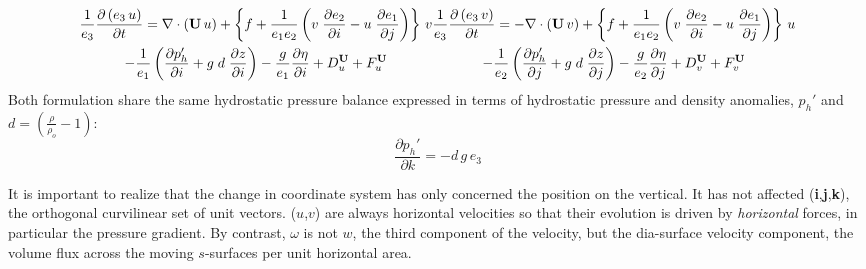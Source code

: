 \documentclass[../main/NEMO_manual]{subfiles}
\begin{document}
\begin{subequations}
  \label{apdx:A_dyn_flux}
  \begin{multline}
    \label{apdx:A_PE_dyn_flux_u}
    \frac{1}{e_3} \frac{\partial \left(  e_3\,u  \right) }{\partial t} =
    \nabla \cdot \left(   {{\rm {\bf U}}\,u}   \right)
    +   \left\{ {f + \frac{1}{e_1 e_2 }\left(    v  \;\frac{\partial e_2 }{\partial i}
          -u  \;\frac{\partial e_1 }{\partial j}            \right)} \right\} \,v     \\
    -   \frac{1}{e_1 } \left(    \frac{\partial p_h'}{\partial i} + g\; d  \; \frac{\partial z}{\partial i}    \right)
    -   \frac{g}{e_1 } \frac{\partial \eta}{\partial i}
    +   D_u^{\vect{U}}  +   F_u^{\vect{U}}
  \end{multline}
  \begin{multline}
    \label{apdx:A_dyn_flux_v}
    \frac{1}{e_3}\frac{\partial \left(  e_3\,v  \right) }{\partial t}=
    -  \nabla \cdot \left(   {{\rm {\bf U}}\,v}   \right)
    +   \left\{ {f + \frac{1}{e_1 e_2 }\left(    v  \;\frac{\partial e_2 }{\partial i}
          -u  \;\frac{\partial e_1 }{\partial j}            \right)} \right\} \,u     \\
    -   \frac{1}{e_2 } \left(    \frac{\partial p_h'}{\partial j} + g\; d  \; \frac{\partial z}{\partial j}    \right)
    -   \frac{g}{e_2 } \frac{\partial \eta}{\partial j}
    +  D_v^{\vect{U}}  +   F_v^{\vect{U}}
  \end{multline}
\end{subequations}
Both formulation share the same hydrostatic pressure balance expressed in terms of
hydrostatic pressure and density anomalies, $p_h'$ and $d=( \frac{\rho}{\rho_o}-1 )$:
\begin{equation}
  \label{apdx:A_dyn_zph}
  \frac{\partial p_h'}{\partial k} = - d \, g \, e_3
\end{equation}

It is important to realize that the change in coordinate system has only concerned the position on the vertical.
It has not affected (\textbf{i},\textbf{j},\textbf{k}), the orthogonal curvilinear set of unit vectors.
($u$,$v$) are always horizontal velocities so that their evolution is driven by \emph{horizontal} forces,
in particular the pressure gradient.
By contrast, $\omega$ is not $w$, the third component of the velocity, but the dia-surface velocity component,
\ie the volume flux across the moving $s$-surfaces per unit horizontal area. 


\end{document}
